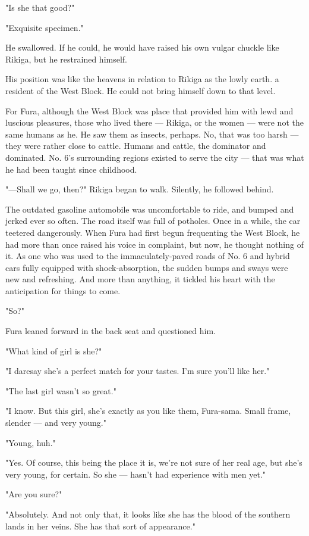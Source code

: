 "Is she that good?"

"Exquisite specimen."

He swallowed. If he could, he would have raised his own vulgar chuckle
like Rikiga, but he restrained himself.

His position was like the heavens in relation to Rikiga as the lowly
earth. a resident of the West Block. He could not bring himself down to
that level.

For Fura, although the West Block was place that provided him with lewd
and luscious pleasures, those who lived there --- Rikiga, or the women ---
were not the same humans as he. He saw them as insects, perhaps. No,
that was too harsh --- they were rather close to cattle. Humans and
cattle, the dominator and dominated. No. 6's surrounding regions existed
to serve the city --- that was what he had been taught since childhood.

"---Shall we go, then?" Rikiga began to walk. Silently, he followed
behind.

\mybreak

The outdated gasoline automobile was uncomfortable to ride, and bumped
and jerked ever so often. The road itself was full of potholes. Once in
a while, the car teetered dangerously. When Fura had first begun
frequenting the West Block, he had more than once raised his voice in
complaint, but now, he thought nothing of it. As one who was used to the
immaculately-paved roads of No. 6 and hybrid cars fully equipped with
shock-absorption, the sudden bumps and sways were new and refreshing.
And more than anything, it tickled his heart with the anticipation for
things to come.

"So?"

Fura leaned forward in the back seat and questioned him.

"What kind of girl is she?"

"I daresay she's a perfect match for your tastes. I'm sure you'll like
her."

"The last girl wasn't so great."

"I know. But this girl, she's exactly as you like them, Fura-sama. Small
frame, slender --- and very young."

"Young, huh."

"Yes. Of course, this being the place it is, we're not sure of her real
age, but she's very young, for certain. So she --- hasn't had experience
with men yet."

"Are you sure?"

"Absolutely. And not only that, it looks like she has the blood of the
southern lands in her veins. She has that sort of appearance."

